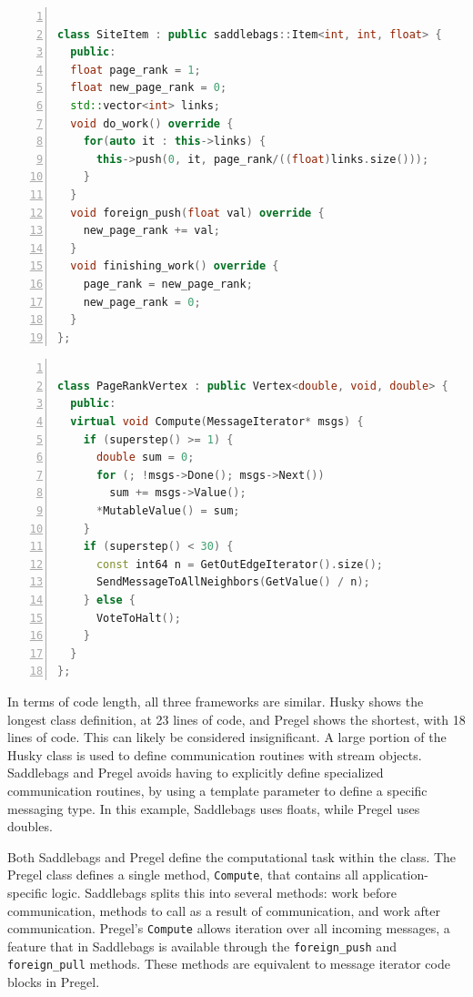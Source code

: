 \documentclass{uit-report}
\begin{document}
\begin{lstlisting}[label={lst:pageranksaddle}, float=h!,frame=tlrb,numbers=left, caption={PageRank item class in Saddlebags}, captionpos=t, language=c++, showstringspaces=false]

class SiteItem : public saddlebags::Item<int, int, float> {
  public:
  float page_rank = 1;
  float new_page_rank = 0;
  std::vector<int> links;
  void do_work() override {
    for(auto it : this->links) {
      this->push(0, it, page_rank/((float)links.size()));
    }
  }
  void foreign_push(float val) override {
    new_page_rank += val;
  }
  void finishing_work() override {
    page_rank = new_page_rank;
    new_page_rank = 0;
  }
};
\end{lstlisting}

\begin{lstlisting}[label={lst:pagerankpregel}, float=h!,frame=tlrb, numbers=left,caption={PageRank vertex class in Pregel}, captionpos=t, language=c++, showstringspaces=false]

class PageRankVertex : public Vertex<double, void, double> {
  public:
  virtual void Compute(MessageIterator* msgs) {
    if (superstep() >= 1) {
      double sum = 0;
      for (; !msgs->Done(); msgs->Next())
        sum += msgs->Value();
      *MutableValue() = sum;
    }
    if (superstep() < 30) {
      const int64 n = GetOutEdgeIterator().size();
      SendMessageToAllNeighbors(GetValue() / n);
    } else {
      VoteToHalt();
    }
  }
};

\end{lstlisting}
\newpage
In terms of code length, all three frameworks are similar. Husky shows the longest class definition, at 23 lines of code, and Pregel shows the shortest, with 18 lines of code. This can likely be considered insignificant. A large portion of the Husky class is used to define communication routines with stream objects. Saddlebags and Pregel avoids having to explicitly define specialized communication routines, by using a template parameter to define a specific messaging type. In this example, Saddlebags uses floats, while Pregel uses doubles.

Both Saddlebags and Pregel define the computational task within the class. The Pregel class defines a single method, \texttt{Compute}, that contains all application-specific logic. Saddlebags splits this into several methods: work before communication, methods to call as a result of communication, and work after communication. Pregel's \texttt{Compute} allows iteration over all incoming messages, a feature that in Saddlebags is available through the \texttt{foreign\_push} and \texttt{foreign\_pull} methods. These methods are equivalent to message iterator code blocks in Pregel.
\end{document}
